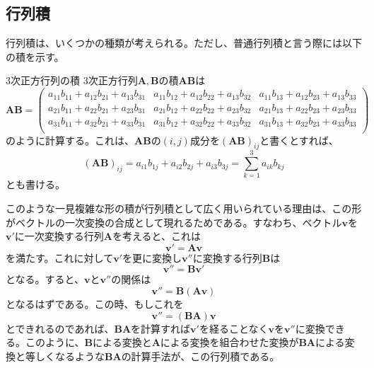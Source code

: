 \subsection{行列積}
行列積は、いくつかの種類が考えられる。ただし、普通行列積と言う際には以下の積を示す。
\begin{definition*}{3次正方行列の積}
	3次正方行列\(\boldsymbol{A},\boldsymbol{B}\)の積\(\boldsymbol{AB}\)は
	\begin{equation}
		\boldsymbol{A}\boldsymbol{B}=
		\begin{pmatrix}
			a_{11}b_{11}+a_{12}b_{21} +a_{13}b_{31} & a_{11}b_{12}+a_{12}b_{22} +a_{13}b_{32} & a_{11}b_{13}+a_{12}b_{23} +a_{13}b_{33} \\
			a_{21}b_{11}+a_{22}b_{21} +a_{23}b_{31} & a_{21}b_{12}+a_{22}b_{22} +a_{23}b_{32} & a_{21}b_{13}+a_{22}b_{23} +a_{23}b_{33} \\
			a_{31}b_{11}+a_{32}b_{21} +a_{33}b_{31} & a_{31}b_{12}+a_{32}b_{22} +a_{33}b_{32} & a_{31}b_{13}+a_{32}b_{23} +a_{33}b_{33} \\
		\end{pmatrix}
	\end{equation}
	のように計算する。これは、\(\boldsymbol{AB}\)の\((i,j)\)成分を\((\boldsymbol{A}\boldsymbol{B})_{ij}\)と書くとすれば、
	\begin{equation}
		(\boldsymbol{A}\boldsymbol{B})_{ij}=a_{i1}b_{1j}+a_{i2}b_{2j}+a_{i3}b_{3j}=\sum_{k=1}^{3} a_{ik}b_{kj}
	\end{equation}
	とも書ける。
\end{definition*}
このような一見複雑な形の積が行列積として広く用いられている理由は、この形がベクトルの一次変換の合成として現れるためである。すなわち、ベクトル\(\boldsymbol{v}\)を\(\boldsymbol{v}'\)に一次変換する行列\(\boldsymbol{A}\)を考えると、これは
\begin{equation}
	\boldsymbol{v}'=\boldsymbol{A}\boldsymbol{v}
\end{equation}
を満たす。これに対して\(\boldsymbol{v}'\)を更に変換し\(\boldsymbol{v}''\)に変換する行列\(\boldsymbol{B}\)は
\begin{equation}
	\boldsymbol{v}''=\boldsymbol{B}\boldsymbol{v}'
\end{equation}
となる。すると、\(\boldsymbol{v}\)と\(\boldsymbol{v}''\)の関係は
\begin{equation}
	\boldsymbol{v}''=\boldsymbol{B}(\boldsymbol{A}\boldsymbol{v})
\end{equation}
となるはずである。この時、もしこれを
\begin{equation}
	\boldsymbol{v}''=(\boldsymbol{B}\boldsymbol{A})\boldsymbol{v}
\end{equation}
とできれるのであれば、\(\boldsymbol{B}\boldsymbol{A}\)を計算すれば\(\boldsymbol{v}'\)を経ることなく\(\boldsymbol{v}\)を\(\boldsymbol{v}''\)に変換できる。このように、\(\boldsymbol{B}\)による変換と\(\boldsymbol{A}\)による変換を組合わせた変換が\(\boldsymbol{B}\boldsymbol{A}\)による変換と等しくなるような\(\boldsymbol{B}\boldsymbol{A}\)の計算手法が、この行列積である。
